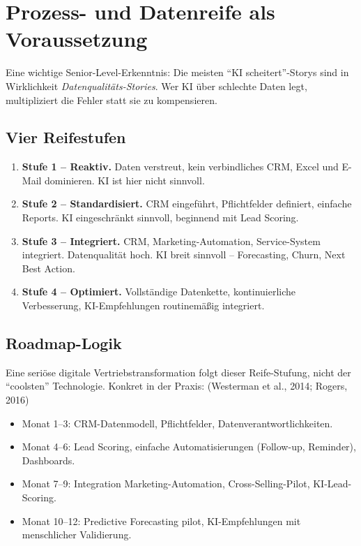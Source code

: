 \documentclass[11pt,a4paper,oneside]{article}
\newcommand{\fachbegriff}[1]{\textbf{#1}}
\newcommand{\quelle}[1]{{\footnotesize\color{lpGray}(#1)}}
\begin{document}
\section{Prozess- und Datenreife als Voraussetzung}

Eine wichtige Senior-Level-Erkenntnis: Die meisten ``KI scheitert''-Storys sind in Wirklichkeit \emph{Datenqualitäts-Stories}. Wer KI über schlechte Daten legt, multipliziert die Fehler statt sie zu kompensieren.

\subsection{Vier Reifestufen}

\begin{enumerate}
  \item \fachbegriff{Stufe 1 -- Reaktiv.} Daten verstreut, kein verbindliches CRM, Excel und E-Mail dominieren. KI ist hier nicht sinnvoll.
  \item \fachbegriff{Stufe 2 -- Standardisiert.} CRM eingeführt, Pflichtfelder definiert, einfache Reports. KI eingeschränkt sinnvoll, beginnend mit Lead Scoring.
  \item \fachbegriff{Stufe 3 -- Integriert.} CRM, Marketing-Automation, Service-System integriert. Datenqualität hoch. KI breit sinnvoll -- Forecasting, Churn, Next Best Action.
  \item \fachbegriff{Stufe 4 -- Optimiert.} Vollständige Datenkette, kontinuierliche Verbesserung, KI-Empfehlungen routinemäßig integriert.
\end{enumerate}

\subsection{Roadmap-Logik}

Eine seriöse digitale Vertriebstransformation folgt dieser Reife-Stufung, nicht der ``coolsten'' Technologie. Konkret in der Praxis: \quelle{Westerman et al., 2014; Rogers, 2016}

\begin{itemize}
  \item Monat 1--3: CRM-Datenmodell, Pflichtfelder, Datenverantwortlichkeiten.
  \item Monat 4--6: Lead Scoring, einfache Automatisierungen (Follow-up, Reminder), Dashboards.
  \item Monat 7--9: Integration Marketing-Automation, Cross-Selling-Pilot, KI-Lead-Scoring.
  \item Monat 10--12: Predictive Forecasting pilot, KI-Empfehlungen mit menschlicher Validierung.
\end{itemize}
\end{document}
